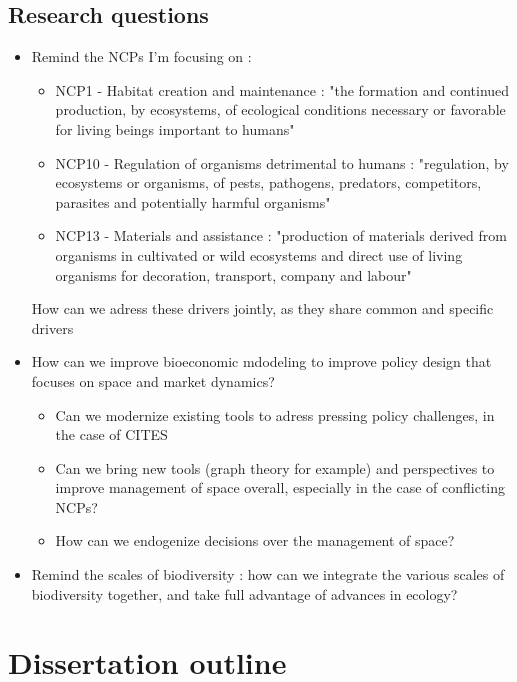 \subsection*{Research questions}

\begin{itemize}
\item Remind the NCPs I'm focusing on :
\begin{itemize}
\item NCP1 - Habitat creation and maintenance : "the formation and continued production, by ecosystems, of ecological conditions necessary or favorable for living beings important to humans"
\item NCP10 - Regulation of organisms detrimental to humans : "regulation, by ecosystems or organisms, of pests, pathogens, predators, competitors, parasites and potentially harmful organisms"
\item NCP13 - Materials and assistance : "production of materials derived from organisms in cultivated or wild ecosystems and direct use of living organisms for decoration, transport, company and labour"
\end{itemize}
 
How can we adress these drivers jointly, as they share common and specific drivers
\item How can we improve bioeconomic mdodeling to improve policy design that focuses on space and market dynamics? 
\begin{itemize}
\item Can we modernize existing tools to adress pressing policy challenges, in the case of CITES
\item Can we bring new tools (graph theory for example) and perspectives to improve management of space overall, especially in the case of conflicting NCPs? 
\item How can we endogenize decisions over the management of space? 
\end{itemize}
\item Remind the scales of biodiversity : how can we integrate the various scales of biodiversity together, and take full advantage of advances in ecology? 
\end{itemize}

\section*{Dissertation outline}
